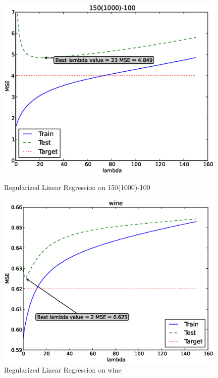 \documentclass[12pt]{article}
\begin{document}
\begin{figure}[h]
\includegraphics[height=.5\textheight]{1/150(1000)-100.eps}
\label{fig:1-150(1000)-100}
\caption{Regularized Linear Regression on 150(1000)-100}
\end{figure}

\begin{figure}[h]
\includegraphics[height=.5\textheight]{1/wine.eps}
\caption{Regularized Linear Regression on wine}
\label{fig:1-wine}
\end{figure}
\end{document}
